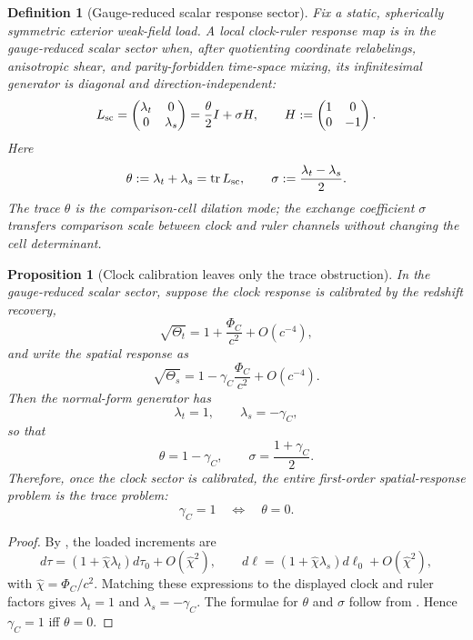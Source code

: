 \documentclass[11pt]{article}
\newtheorem{proposition}[theorem]{Proposition}
\newtheorem{definition}[theorem]{Definition}
\theoremstyle{remark}
\begin{document}
\begin{definition}[Gauge-reduced scalar response sector]
\label{def:gauge-reduced-scalar-sector}
Fix a static, spherically symmetric exterior weak-field load.  A local clock-ruler response map is in the gauge-reduced scalar sector when, after quotienting coordinate relabelings, anisotropic shear, and parity-forbidden time-space mixing, its infinitesimal generator is diagonal and direction-independent:
\[
        L_{\rm sc}
        =
        \begin{pmatrix}
        \lambda_t & 0\\
        0 & \lambda_s
        \end{pmatrix}
        =\frac{\theta}{2}I+\sigma H,
        \qquad
        H:=
        \begin{pmatrix}
        1&0\\
        0&-1
        \end{pmatrix}.
\]
Here
\[
        \theta:=\lambda_t+\lambda_s=\operatorname{tr}L_{\rm sc},
        \qquad
        \sigma:=\frac{\lambda_t-\lambda_s}{2}.
\]
The trace \(\theta\) is the comparison-cell dilation mode; the exchange coefficient \(\sigma\) transfers comparison scale between clock and ruler channels without changing the cell determinant.
\end{definition}

\begin{proposition}[Clock calibration leaves only the trace obstruction]
\label{prop:normal-form-trace-obstruction}
In the gauge-reduced scalar sector, suppose the clock response is calibrated by the redshift recovery,
\[
        \sqrt{\Theta_t}=1+\frac{\Phi_C}{c^2}+O(c^{-4}),
\]
and write the spatial response as
\[
        \sqrt{\Theta_s}=1-\gamma_C\frac{\Phi_C}{c^2}+O(c^{-4}).
\]
Then the normal-form generator has
\[
        \lambda_t=1,
        \qquad
        \lambda_s=-\gamma_C,
\]
so that
\[
        \theta=1-
        \gamma_C,
        \qquad
        \sigma=\frac{1+
        \gamma_C}{2}.
\]
Therefore, once the clock sector is calibrated, the entire first-order spatial-response problem is the trace problem:
\[
        \gamma_C=1
        \quad\Longleftrightarrow\quad
        \theta=0.
\]
\end{proposition}

\begin{proof}
By , the loaded increments are
\[
        d\tau=(1+\hat\chi\lambda_t)d\tau_0+O(\hat\chi^2),
        \qquad
        d\ell=(1+\hat\chi\lambda_s)d\ell_0+O(\hat\chi^2),
\]
with \(\hat\chi=\Phi_C/c^2\).  Matching these expressions to the displayed clock and ruler factors gives \(\lambda_t=1\) and \(\lambda_s=-\gamma_C\).  The formulae for \(\theta\) and \(\sigma\) follow from .  Hence \(\gamma_C=1\) iff \(\theta=0\).
\end{proof}
\end{document}
